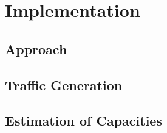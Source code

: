 \chapter{Implementation}

\section{Approach}

\section{Traffic Generation}

\section{Estimation of Capacities}




